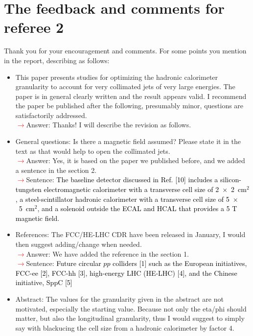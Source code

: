 \documentclass[final,1p,11pt]{elsarticle}
\begin{document}
\section{The feedback and comments for referee 2}
Thank you for your encouragement and comments. For some points you mention in the report, describing as follows:\\
\begin{itemize}
\item This paper presents studies for optimizing the hadronic calorimeter granularity to account for very collimated jets of very large energies.
The paper is in general clearly written and the result appears valid. I recommend the paper be published after the following, presumably minor, questions are satisfactorily addressed.\\
 \textcolor{red}{$\rightarrow$}Answer: Thanks! I will describe the revision as follows.\\
\item General questions: Is there a magnetic field assumed? Please state it in the text as that would help to open the collimated jets.\\
 \textcolor{red}{$\rightarrow$}Answer: Yes, it is based on the paper we published before, and we added a sentence in the section 2.\\
 \textcolor{red}{$\rightarrow$}Sentence: \textcolor{black}{The baseline detector discussed in Ref. [10]
includes a silicon-tungsten electromagnetic calorimeter with a transverse cell size of 2~$\times$~2~cm$^2$, a steel-scintillator hadronic calorimeter with a transverse cell size of 5~$\times$~5~cm$^2$, and a solenoid outside the ECAL and HCAL that provides a 5 T magnetic field.}
\item References: The FCC/HE-LHC CDR have been released in January, I would then suggest adding/change when needed.\\
 \textcolor{red}{$\rightarrow$}Answer: We have added the reference in the section 1.\\
 \textcolor{red}{$\rightarrow$}Sentence: \textcolor{black}{Future circular $pp$ colliders [1] such as the European initiatives, FCC-ee [2], FCC-hh [3], high-energy LHC (HE-LHC) [4], and the Chinese initiative, SppC [5] }
\item Abstract: The values for the granularity given in the abstract are not motivated, especially the starting value. Because not only the eta/phi should matter, but also the longitudinal granularity, thus I would suggest to simply say with blackucing the cell size from a hadronic calorimeter by factor 4.\\

\end{itemize}
\end{document}
